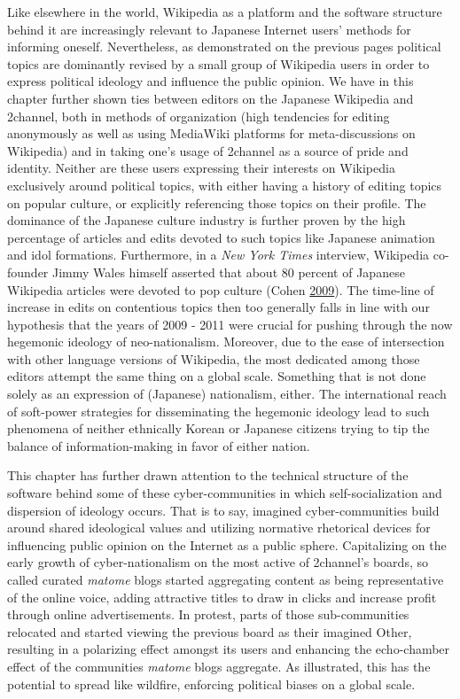 \documentclass[10pt,british,A4paper,oneside]{memoir}
\begin{document}
Like elsewhere in the world, Wikipedia as a platform and the software
structure behind it are increasingly relevant to Japanese Internet
users' methods for informing oneself. Nevertheless, as demonstrated on
the previous pages political topics are dominantly revised by a small
group of Wikipedia users in order to express political ideology and
influence the public opinion. We have in this chapter further shown ties
between editors on the Japanese Wikipedia and 2channel, both in methods
of organization (high tendencies for editing anonymously as well as
using MediaWiki platforms for meta-discussions on Wikipedia) and in
taking one's usage of 2channel as a source of pride and identity.
Neither are these users expressing their interests on Wikipedia
exclusively around political topics, with either having a history
of editing topics on popular culture, or explicitly referencing those
topics on their profile. The dominance of the Japanese culture industry
is further proven by the high percentage of articles and edits devoted
to such topics like Japanese animation and idol formations. Furthermore,
in a \emph{New York Times} interview, Wikipedia co-founder Jimmy Wales
himself asserted that about 80 percent of Japanese Wikipedia articles
were devoted to pop culture (Cohen
\protect\hyperlink{ref-cohen_wikipedia_2009}{2009}). The time-line of
increase in edits on contentious topics then too generally falls in line
with our hypothesis that the years of 2009 - 2011 were crucial for pushing through the now hegemonic ideology of neo-nationalism. Moreover, due to the
ease of intersection with other language versions of Wikipedia, the most
dedicated among those editors attempt the same thing on a global scale.
Something that is not done solely as an expression of (Japanese)
nationalism, either. The international reach of soft-power strategies
for disseminating the hegemonic ideology lead to such phenomena of
neither ethnically Korean or Japanese citizens trying to tip the balance
of information-making in favor of either nation.

This chapter has
further drawn attention to the technical structure of the software
behind some of these cyber-communities in which self-socialization and
dispersion of ideology occurs. That is to say, imagined
cyber-communities build around shared ideological values and utilizing
normative rhetorical devices for influencing public opinion on the
Internet as a public sphere. Capitalizing on the early growth of
cyber-nationalism on the most active of 2channel's boards, so called
curated \emph{matome} blogs started aggregating content as being
representative of the online voice, adding attractive titles to draw in
clicks and increase profit through online advertisements. In protest,
parts of those sub-communities relocated and started viewing the
previous board as their imagined Other, resulting in a polarizing effect
amongst its users and enhancing the echo-chamber effect of the
communities \emph{matome} blogs aggregate. As illustrated, this has the
potential to spread like wildfire, enforcing political biases on a
global scale.
\end{document}
